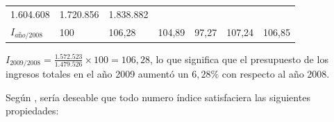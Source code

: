\documentclass[
]{book}
\begin{document}
\begin{longtable}[]{@{}lllllll@{}}
\begin{minipage}[t]{0.12\columnwidth}
1.604.608\strut
\end{minipage} & \begin{minipage}[t]{0.12\columnwidth}\raggedright
1.720.856\strut
\end{minipage} & \begin{minipage}[t]{0.12\columnwidth}\raggedright
1.838.882\strut
\end{minipage}\tabularnewline
\begin{minipage}[t]{0.12\columnwidth}\raggedright
\(I_{año/2008}\)\strut
\end{minipage} & \begin{minipage}[t]{0.10\columnwidth}\raggedright
100\strut
\end{minipage} & \begin{minipage}[t]{0.11\columnwidth}\raggedright
106,28\strut
\end{minipage} & \begin{minipage}[t]{0.13\columnwidth}\raggedright
104,89\strut
\end{minipage} & \begin{minipage}[t]{0.12\columnwidth}\raggedright
97,27\strut
\end{minipage} & \begin{minipage}[t]{0.12\columnwidth}\raggedright
107,24\strut
\end{minipage} & \begin{minipage}[t]{0.12\columnwidth}\raggedright
106,85\strut
\end{minipage}\tabularnewline
\bottomrule
\end{longtable}

\(I_{2009/2008}=\frac{1.572.523}{1.479.526}\times 100=106,28\), lo que significa que el presupuesto de los ingresos totales en el año 2009 aumentó un \(6,28\%\) con respecto al año 2008.

Según \citet{perez2010nociones}, sería deseable que todo numero índice satisfaciera las siguientes propiedades:
\end{document}
